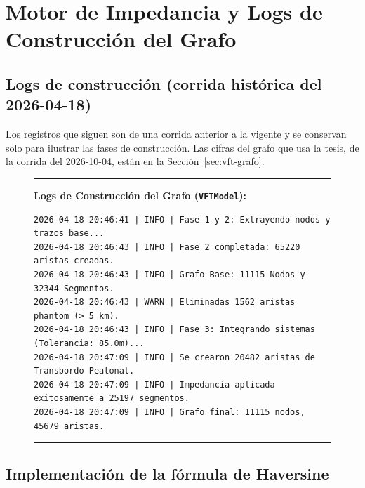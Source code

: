 
\section{Motor de Impedancia y Logs de Construcción del Grafo}
\label{anx:vft-codigo}

\subsection*{Logs de construcción (corrida histórica del 2026-04-18)}

Los registros que siguen son de una corrida anterior a la vigente y se
conservan solo para ilustrar las fases de construcción. Las cifras del grafo
que usa la tesis, de la corrida del 2026-10-04, están en la
Sección~\ref{sec:vft-grafo}.

\begin{figure}[H]
    \centering
    \fontsize{7.5pt}{9pt}\selectfont
    \begin{minipage}{0.95\textwidth}
        \hrule\vspace{1ex}
        \textbf{Logs de Construcción del Grafo (\texttt{VFTModel}):}
        \vspace{1ex}
        \begin{verbatim}
2026-04-18 20:46:41 | INFO | Fase 1 y 2: Extrayendo nodos y trazos base...
2026-04-18 20:46:43 | INFO | Fase 2 completada: 65220 aristas creadas.
2026-04-18 20:46:43 | INFO | Grafo Base: 11115 Nodos y 32344 Segmentos.
2026-04-18 20:46:43 | WARN | Eliminadas 1562 aristas phantom (> 5 km).
2026-04-18 20:46:43 | INFO | Fase 3: Integrando sistemas (Tolerancia: 85.0m)...
2026-04-18 20:47:09 | INFO | Se crearon 20482 aristas de Transbordo Peatonal.
2026-04-18 20:47:09 | INFO | Impedancia aplicada exitosamente a 25197 segmentos.
2026-04-18 20:47:09 | INFO | Grafo final: 11115 nodos, 45679 aristas.
        \end{verbatim}
        \hrule
    \end{minipage}
\end{figure}

\subsection*{Implementación de la fórmula de Haversine}


